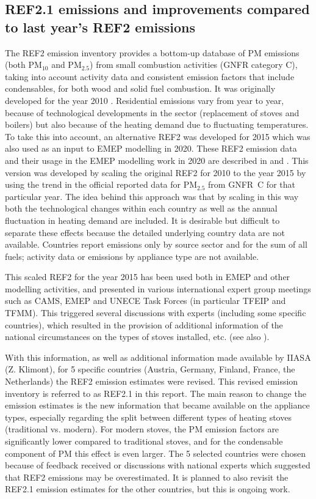 \subsection{REF2.1 emissions and improvements compared to last year's REF2 emissions}
\label{sec:ref2.1}

The REF2 emission inventory provides a bottom-up database of PM emissions (both PM$_{10}$ and PM$_{2.5}$) from small combustion activities (GNFR category C), taking into account activity data and consistent emission factors that include condensables, for both wood and solid fuel combustion. It was originally developed for the year 2010 \citep{DeniervanderGon2015}. Residential emissions vary from year to year, because of technological developments in the sector (replacement of stoves and boilers) but also because of the heating demand due to fluctuating temperatures. To take this into account, an alternative REF2 was developed for 2015 which was also used as an input to EMEP modelling in 2020. These REF2 emission data and their usage in the EMEP modelling work in 2020 are described in  \citet{R2020:CAMSREF2} and \citet{R2020:SVOC}. This version was developed by scaling the original REF2 for 2010 to the year 2015 by using the trend in the official reported data for PM$_{2.5}$ from GNFR~C for that particular year. The idea behind this approach was that by scaling in this way both the technological changes within each country as well as the annual fluctuation in heating demand are included. It is desirable but difficult to separate these effects because the detailed underlying country data are not available. Countries report emissions only by source sector and for the sum of all fuels; activity data or emissions by appliance type are not available.

This scaled REF2 for the year 2015 has been used both in EMEP and other modelling activities, and presented in various international expert group meetings such as CAMS, EMEP and UNECE Task Forces (in particular TFEIP and TFMM). This triggered several discussions with experts (including some specific countries), which resulted in the provision of additional information of the national circumstances on the types of stoves installed, etc. (see also \cite{CONDws2020}). 

With this information, as well as additional information made available by IIASA (Z. Klimont), for 5 specific countries (Austria, Germany, Finland, France, the Netherlands) the REF2 emission estimates were revised. This revised emission inventory is referred to as REF2.1 in this report. The main reason to change the emission estimates is the new information that became available on the appliance types, especially regarding the split between different types of heating stoves (traditional vs. modern). For modern stoves, the PM emission factors are significantly lower compared to traditional stoves, and for the condensable component of PM this effect is even larger.
The 5 selected countries were chosen because of feedback received or discussions with national experts which suggested that REF2 emissions may be overestimated. It is planned to also revisit the REF2.1 emission estimates for the other countries, but this is ongoing work.

